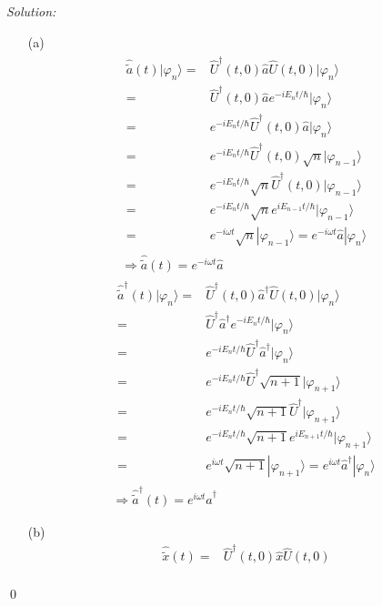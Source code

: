 \documentclass[12pt,a4paper]{article}
\newenvironment{sol}
    {\emph{Solution:}
    }
    {
    \qed
    }
\begin{document}
\begin{sol}
\begin{itemize}
\item[(a)]
\begin{gather}
\begin{align}
\nonumber\hat{\tilde{a}}(t)|\varphi_n\rangle=&\hat{U}^{\dagger}(t,0)\hat{a}\hat{U}(t,0)|\varphi_n\rangle\\
\nonumber=&\hat{U}^{\dagger}(t,0)\hat{a}e^{-iE_nt/\hbar}|\varphi_n\rangle\\
\nonumber=&e^{-iE_nt/\hbar}\hat{U}^{\dagger}(t,0)\hat{a}|\varphi_n\rangle\\
\nonumber=&e^{-iE_nt/\hbar}\hat{U}^{\dagger}(t,0)\sqrt{n}|\varphi_{n-1}\rangle\\
\nonumber=&e^{-iE_nt/\hbar}\sqrt{n}\hat{U}^{\dagger}(t,0)|\varphi_{n-1}\rangle\\
\nonumber=&e^{-iE_nt/\hbar}\sqrt{n}e^{iE_{n-1}t/\hbar}|\varphi_{n-1}\rangle\\
=&e^{-i\omega t}\sqrt{n}|\varphi_{n-1}\rangle=e^{-i\omega t}\hat{a}|\varphi_n\rangle
\end{align}\\
\Longrightarrow\hat{\tilde{a}}(t)=e^{-i\omega t}\hat{a}
\end{gather}
\begin{gather}
\begin{align}
\nonumber\hat{\tilde{a}}^{\dagger}(t)|\varphi_n\rangle=&\hat{U}^{\dagger}(t,0)\hat{a}^{\dagger}\hat{U}(t,0)|\varphi_n\rangle\\
\nonumber=&\hat{U}^{\dagger}\hat{a}^{\dagger}e^{-iE_nt/\hbar}|\varphi_n\rangle\\
\nonumber=&e^{-iE_nt/\hbar}\hat{U}^{\dagger}\hat{a}^{\dagger}|\varphi_n\rangle\\
\nonumber=&e^{-iE_nt/\hbar}\hat{U}^{\dagger}\sqrt{n+1}|\varphi_{n+1}\rangle\\
\nonumber=&e^{-iE_nt/\hbar}\sqrt{n+1}\hat{U}^{\dagger}|\varphi_{n+1}\rangle\\
\nonumber=&e^{-iE_nt/\hbar}\sqrt{n+1}e^{iE_{n+1}t/\hbar}|\varphi_{n+1}\rangle\\
=&e^{i\omega t}\sqrt{n+1}|\varphi_{n+1}\rangle=e^{i\omega t}\hat{a}^{\dagger}|\varphi_n\rangle
\end{align}\\
\Longrightarrow\hat{\tilde{a}}^{\dagger}(t)=e^{i\omega t}\hat{a}^{\dagger}
\end{gather}
\item[(b)]
\begin{align}
\nonumber\hat{\tilde{x}}(t)=&\hat{U}^{\dagger}(t,0)\hat{x}\hat{U}(t,0)\\

\end{align}
\end{itemize}
\end{sol}
\end{document}
